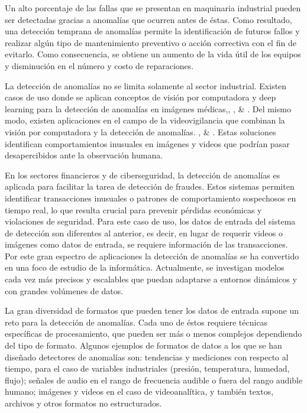 \documentclass[11pt,a4paper,spanish]{book}
\numberwithin{equation}{chapter}
\numberwithin{figure}{chapter}
\begin{document}
Un alto porcentaje de las fallas que se presentan en maquinaria industrial pueden ser
detectadas gracias a anomalías que ocurren antes de éstas. Como resultado, una detección
temprana de anomalías permite la identificación de futuros fallos y realizar algún tipo 
de mantenimiento preventivo o acción correctiva con el fin de evitarlo. Como 
consecuencia, se obtiene un aumento de la vida útil de los equipos y disminución en el
número y costo de reparaciones. 


La detección de anomalías no se limita solamente al sector industrial. Existen casos de
uso donde se aplican conceptos de visión por computadora y deep learning para la 
detección de anomalías en imágenes médicas,\cite{zhou2021proxy}, \cite{guo2024encoder}, 
\cite{lu2024heterogeneous} \& \cite{zhong2022video}.
Del mismo modo, existen aplicaciones en el campo de la videovigilancia que combinan la 
visión por computadora y la detección de anomalías. \cite{zhong2022video}, 
\cite{zeng2021graph} \& \cite{zhang2022influence}. 
Estas soluciones identifican comportamientos inusuales en imágenes y videos que podrían
pasar desapercibidos ante la observación humana.


En los sectores financieros y de ciberseguridad, la detección de  anomalías es aplicada
para facilitar la tarea de detección de fraudes. Estos sistemas permiten identificar
transacciones inusuales o patrones de comportamiento sospechosos en tiempo real, lo que
resulta crucial para prevenir pérdidas económicas y violaciones de seguridad. Para este
caso de uso, los datos de entrada del sistema de detección son diferentes al anterior,
es decir, en lugar de requerir videos o imágenes como datos de entrada, se requiere
información de las transacciones. Por este gran espectro de aplicaciones la detección de
anomalías se ha convertido en una foco de estudio de la informática. Actualmente, se 
investigan modelos cada vez más precisos y escalables que puedan adaptarse a entornos 
dinámicos y con grandes volúmenes de datos. 


La gran diversidad de formatos que pueden tener los datos de entrada supone un reto para
la detección de anomalías. Cada uno de éstos requiere técnicas específicas de 
procesamiento, que pueden ser más o menos complejos dependiendo del tipo de formato. 
Algunos ejemplos de formatos de datos a los que se han diseñado detectores de anomalías 
son: tendencias y mediciones con respecto al tiempo, para el caso de variables 
industriales (presión, temperatura, humedad, flujo); señales de audio en el rango de 
frecuencia audible o fuera del rango audible humano; imágenes y videos en el caso de 
videoanalítica, y también textos, archivos y otros formatos no estructurados. 
\end{document}
